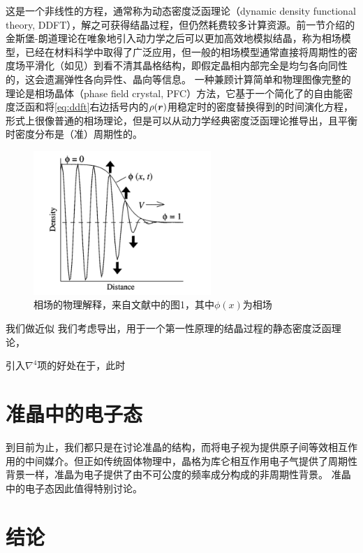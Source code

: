 \documentclass[hyperref, UTF8, a4paper]{ctexart}
\begin{document}
这是一个非线性的方程，通常称为动态密度泛函理论（dynamic density functional theory, DDFT），解之可获得结晶过程\cite{Neuhaus_2014}，但仍然耗费较多计算资源。前一节介绍的金斯堡-朗道理论在唯象地引入动力学之后可以更加高效地模拟结晶，称为相场模型，已经在材料科学中取得了广泛应用，但一般的相场模型通常直接将周期性的密度场平滑化（如见）到看不清其晶格结构，即假定晶相内部完全是均匀各向同性的，这会遗漏弹性各向异性、晶向等信息。
一种兼顾计算简单和物理图像完整的理论是相场晶体（phase field crystal, PFC）方法，它基于一个简化了的自由能密度泛函和将\eqref{eq:ddft}右边括号内的$\rho(\vb*{r})$用稳定时的密度替换得到的时间演化方程，形式上很像普通的相场理论，但是可以从动力学经典密度泛函理论推导出，且平衡时密度分布是（准）周期性的\cite{pfc2009,PhysRevB.75.064107}。

\begin{figure}
    \centering
    \includegraphics[width=0.6\textwidth]{phase-field.PNG}
    \caption{相场的物理解释，来自文献\cite{boettinger2002phase}中的图1，其中$\phi(x)$为相场}
    \label{fig:phase-field}
\end{figure}

我们做近似
我们考虑\cite{PhysRevB.19.2775}导出，用于一个第一性原理的结晶过程的静态密度泛函理论，

引入$\nabla^4$项的好处在于，此时\cite{PhysRevE.70.051605}

\section{准晶中的电子态}

到目前为止，我们都只是在讨论准晶的结构，而将电子视为提供原子间等效相互作用的中间媒介。但正如传统固体物理中，晶格为库仑相互作用电子气提供了周期性背景一样，准晶为电子提供了由不可公度的频率成分构成的非周期性背景。
准晶中的电子态因此值得特别讨论。

\section{结论}


 
\end{document}
